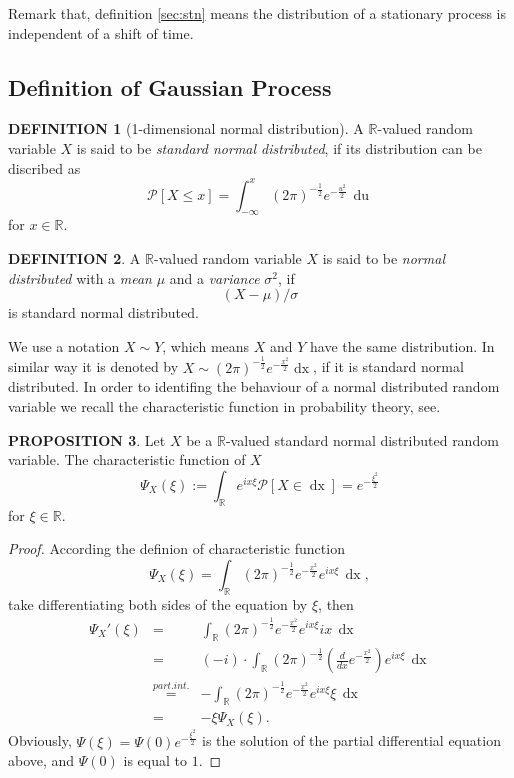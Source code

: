 \documentclass[a4paper, twoside, 11pt]{article}
\theoremstyle{definition}
\newtheorem{definition}{DEFINITION}[section]
\newtheorem{proposition}[definition]{\large PROPOSITION}
\newcommand{\sqbr}[1]{\left[ {#1} \right]}
\begin{document}
Remark that, definition \ref{sec:stn} means the distribution of a stationary process is independent of a shift of time.

\subsection{Definition of Gaussian Process}
\begin{definition}[1-dimensional normal distribution]
  A $\mathbb{R}$-valued random variable $X$ is said to be \emph{standard normal distributed}, if its distribution can be discribed as
  \[
	\mathcal{P}\sqbr{X \le x} = \int_{-\infty}^{x} (2\pi)^{-\frac{1}{2}}e^{-\frac{u^2}{2}}\,\mathop{du}  
  \]
  for $x \in \mathbb{R}$.
\end{definition}

\begin{definition}
  A $\mathbb{R}$-valued random variable $X$ is said to be \emph{normal distributed} with a \emph{mean} $\mu$ and a \emph{variance} $\sigma^2$, if
\[
  (X-\mu) / \sigma
\]
is standard normal distributed.
\end{definition}

We use a notation $X \sim Y$, which means $X$ and $Y$ have the same distribution. In similar way it is denoted by $X \sim (2\pi)^{-\frac{1}{2}}e^{-\frac{x^2}{2}}\mathop{dx} $, if it is standard normal distributed. In order to identifing the behaviour of a normal distributed random variable we recall the characteristic function in probability theory, see\cite{bauer}. 

\begin{proposition}
  Let $X$ be a $\mathbb{R}$-valued standard normal distributed random variable. The characteristic function of $X$
\begin{equation}
  \Psi_X(\xi) := \int_\mathbb{R} e^{ix\xi}\mathcal{P}\sqbr{X \in \mathop{dx}} = e^{-\frac{\xi^2}{2}}
  \label{sec:cht}
\end{equation}
for $\xi \in \mathbb{R}$.
\end{proposition}
\begin{proof}
  According the definion of characteristic function
  \begin{equation*}
	\Psi_X(\xi) = \int_\mathbb{R} (2\pi)^{-\frac{1}{2}}e^{-\frac{x^2}{2}}e^{ix\xi}\,\mathop{dx},
  \end{equation*}
take differentiating both sides of the equation by $\xi$, then
\begin{eqnarray*}
\Psi_X'(\xi) &=& \int_\mathbb{R}(2\pi)^{-\frac{1}{2}}e^{-\frac{x^2}{2}}e^{ix\xi}ix\,\mathop{dx}\\
             &=& (-i)\cdot\int_\mathbb{R} (2\pi)^{-\frac{1}{2}}(\frac{d}{dx}e^{-\frac{x^2}{2}})e^{ix\xi}\,\mathop{dx}\\
			 &\overset{part.int.}{=}& -\int_\mathbb{R}(2\pi)^{-\frac{1}{2}}e^{-\frac{x^2}{2}}e^{ix\xi}\xi\,\mathop{dx}\\
			 &=& -\xi\Psi_X(\xi).
\end{eqnarray*}
Obviously, 
$\Psi(\xi) = \Psi(0)e^{-\frac{\xi^2}{2}}$ is the solution of the partial differential equation above, and $\Psi(0)$ is equal to $1$.
\end{proof}
\end{document}
